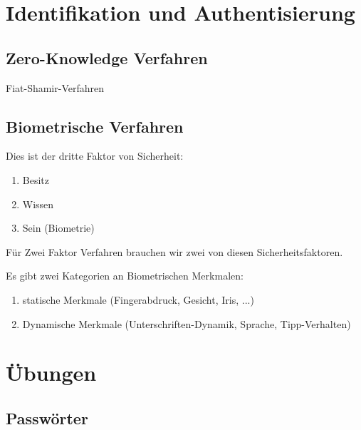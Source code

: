 \documentclass[a4paper]{article}
\title{\docTitle}
\author{Moritz}
\date{\today}
\begin{document}
\maketitle
\tableofcontents


\section{Identifikation und Authentisierung}


\subsection{Zero-Knowledge Verfahren}


Fiat-Shamir-Verfahren

\subsection{Biometrische Verfahren}

Dies ist der dritte Faktor von Sicherheit:

\begin{enumerate}
    \item Besitz
    \item Wissen
    \item Sein (Biometrie)
\end{enumerate}

Für Zwei Faktor Verfahren brauchen wir zwei von diesen Sicherheitsfaktoren.

Es gibt zwei Kategorien an Biometrischen Merkmalen:

\begin{enumerate}
    \item statische Merkmale (Fingerabdruck, Gesicht, Iris, ...)
    \item Dynamische Merkmale (Unterschriften-Dynamik, Sprache, Tipp-Verhalten)
\end{enumerate}

\section{Übungen}

\subsection{Passwörter}
\end{document}
